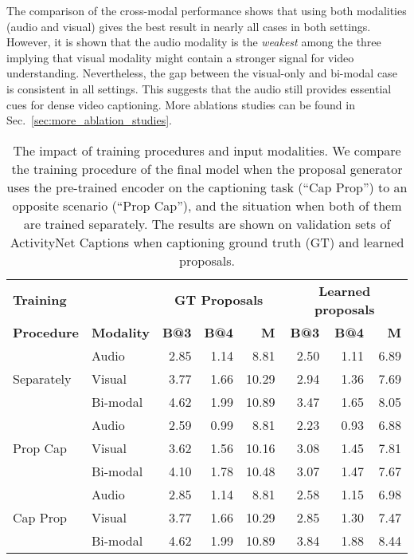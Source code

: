 \documentclass{src/bmvc2k}
\begin{document}
The comparison of the cross-modal performance shows that using both modalities (audio and visual) gives the best result in nearly all cases in both settings. However, it is shown that the audio modality is the \textit{weakest} among the three implying that visual modality might contain a stronger signal for video understanding. Nevertheless, the gap between the visual-only and bi-modal case is consistent in all settings. This suggests that the audio still provides essential cues for dense video captioning. More ablations studies can be found in Sec.~\ref{sec:more_ablation_studies}.\vspace{-2ex}

\begin{table}
\centering
\clearpage{}\newcommand{\parlength}{5em}

\begin{tabular}{l l rrr rrr}
\toprule 
\textbf{Training} & & \multicolumn{3}{c}{ \textbf{GT Proposals} } & \multicolumn{3}{c}{ \textbf{Learned proposals} } \\
\textbf{Procedure} & \textbf{Modality} & \textbf{B@3} & \textbf{B@4} & \textbf{M} & \textbf{B@3} & \textbf{B@4} & \textbf{M} \\
\midrule 
\multirow{3}{*}{ \parbox{\parlength}{\small Separately} } & Audio & 2.85 & 1.14 & 8.81 & 2.50 & 1.11 & 6.89 \\
& Visual & 3.77 & 1.66 & 10.29 & 2.94 & 1.36 & 7.69 \\
& Bi-modal & 4.62 & 1.99 & 10.89 & 3.47 & 1.65 & 8.05 \\
\midrule
\multirow{3}{*}{ \parbox{\parlength}{\small Prop  Cap} } & Audio & 2.59 & 0.99 & 8.81 & 2.23 & 0.93 & 6.88 \\
& Visual & 3.62 & 1.56 & 10.16 & 3.08 & 1.45 & 7.81 \\
& Bi-modal & 4.10 & 1.78 & 10.48 & 3.07 & 1.47 & 7.67 \\
\midrule 
\multirow{3}{*}{ \parbox{\parlength}{\small Cap  Prop} } & Audio & 2.85 & 1.14 & 8.81 & 2.58 & 1.15 & 6.98 \\
& Visual & 3.77 & 1.66 & 10.29 & 2.85 & 1.30 & 7.47 \\
& Bi-modal & 4.62 & 1.99 & 10.89 & 3.84 & 1.88 & 8.44 \\
\bottomrule
\end{tabular}
\clearpage{}
\caption{The impact of training procedures and input modalities. We compare the training procedure of the final model when the proposal generator uses the pre-trained encoder on the captioning task (``Cap  Prop'') to an opposite scenario (``Prop  Cap''), and the situation when both of them are trained separately. The results are shown on validation sets of ActivityNet Captions when captioning ground truth (GT) and learned proposals. \label{tab:ablation_table}}
\vspace{-1.5ex}
\end{table}
\end{document}

